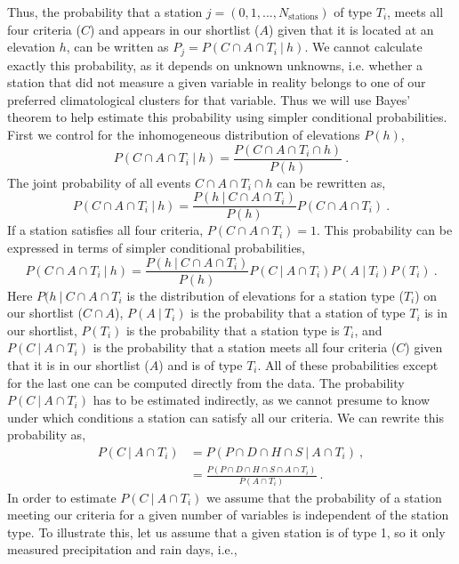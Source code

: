 \documentclass[12pt]{iopart}
\begin{document}
Thus, the probability that a station $j=(0,1,...,N_\mathrm{stations})$ of type $T_i$, meets all four criteria ($C$) and appears in our shortlist ($A$) given that it is located at an elevation $h$, can be written as $P_j=P(C\cap A\cap T_i\ |\ h)$. We cannot  calculate exactly this probability, as it depends on unknown unknowns, i.e. whether a station that did not measure a given variable in reality belongs to one of our preferred climatological clusters for that variable. Thus we will use Bayes' theorem to help estimate this probability using simpler conditional probabilities. First we control for the inhomogeneous distribution of elevations $P(h)$,
\begin{equation}
P(C\cap A\cap T_i\ |\ h)=\frac{P(C\cap A\cap T_i\cap h)}{P(h)}\ .
\end{equation}
The joint probability of all events $C\cap A\cap T_i\cap h$ can be rewritten as,
\begin{equation}
P(C\cap A\cap T_i\ |\ h)=\frac{P(h\ |\ C\cap A\cap T_i)}{P(h)}P(C\cap A\cap T_i)\ .
\end{equation}
If a station satisfies all four criteria, $P(C\cap A\cap T_i)=1$. This probability can be expressed in terms of simpler conditional probabilities,
\begin{equation}
P(C\cap A\cap T_i\ |\ h)=\frac{P(h\ |\ C\cap A\cap T_i)}{P(h)}P(C\ |\ A\cap T_i)P(A\ |\ T_i)P(T_i)\ .
\end{equation}
Here $P(h\ |\ C\cap A\cap T_i$ is the distribution of elevations for a station type ($T_i$) on our shortlist ($C\cap A$), $P(A\ |\ T_i)$ is the probability that a station of type $T_i$ is in our shortlist, $P(T_i)$ is the probability that a station type is $T_i$, and $P(C\ |\ A\cap T_i)$ is the probability that a station meets all four criteria ($C$) given that it is in our shortlist ($A$) and is of type $T_i$. All of these probabilities except for the last one can be computed directly from the data.  The probability $P(C\ |\ A\cap T_i)$ has to be estimated indirectly, as we cannot presume to know under which conditions a station can satisfy all our criteria. We can rewrite this probability as,
\begin{eqnarray}
P(C\ |\ A\cap T_i)&=P(P\cap D\cap H\cap S\ |\ A\cap T_i)\ , \\
\label{pclanti}
&=\frac{P(P\cap D\cap H\cap S\cap A\cap T_i)}{P(A\cap T_i)}\ . 
\end{eqnarray}
In order to estimate $P(C\ |\ A\cap T_i)$ we assume that the probability of a station meeting our criteria for a given number of variables is independent of the station type. To illustrate this, let us assume that a given station is of type 1, so it only measured precipitation and rain days, i.e.,
\end{document}
